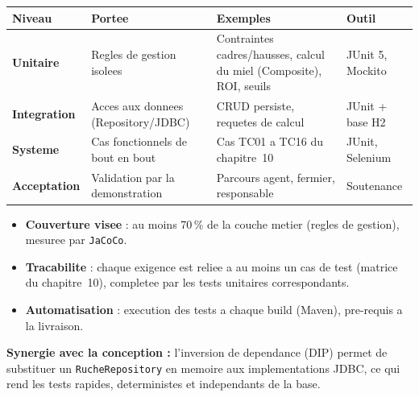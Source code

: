 \begin{longtable}{>{\bfseries}p{2.8cm} p{4.4cm} p{4.4cm} C{2.2cm}}
\toprule
\textbf{Niveau} & \textbf{Portee} & \textbf{Exemples} & \textbf{Outil} \\
\midrule
\endhead
Unitaire      & Regles de gestion isolees          & Contraintes cadres/hausses, calcul du miel (Composite), ROI, seuils & JUnit 5, Mockito \\
Integration   & Acces aux donnees (Repository/JDBC) & CRUD persiste, requetes de calcul                                   & JUnit + base H2 \\
Systeme       & Cas fonctionnels de bout en bout    & Cas TC01 a TC16 du chapitre~10                                      & JUnit, Selenium \\
Acceptation   & Validation par la demonstration     & Parcours agent, fermier, responsable                                & Soutenance \\
\bottomrule
\end{longtable}

\begin{itemize}
  \item \textbf{Couverture visee} : au moins 70\,\% de la couche metier (regles de gestion), mesuree par \texttt{JaCoCo}.
  \item \textbf{Tracabilite} : chaque exigence est reliee a au moins un cas de test (matrice du chapitre~10), completee par les tests unitaires correspondants.
  \item \textbf{Automatisation} : execution des tests a chaque build (Maven), pre-requis a la livraison.
\end{itemize}

\begin{encadre}
\textbf{Synergie avec la conception :} l'inversion de dependance (DIP) permet de
substituer un \texttt{RucheRepository} en memoire aux implementations JDBC, ce
qui rend les tests rapides, deterministes et independants de la base.
\end{encadre}
